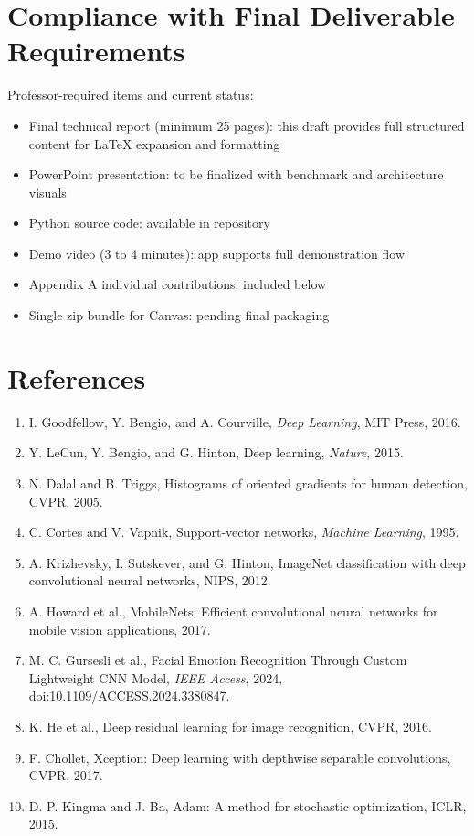 \documentclass[12pt,a4paper]{article}
\begin{document}
\section{Compliance with Final Deliverable Requirements}
Professor-required items and current status:
\begin{itemize}[leftmargin=*]
    \item Final technical report (minimum 25 pages): this draft provides full structured content for LaTeX expansion and formatting
    \item PowerPoint presentation: to be finalized with benchmark and architecture visuals
    \item Python source code: available in repository
    \item Demo video (3 to 4 minutes): app supports full demonstration flow
    \item Appendix A individual contributions: included below
    \item Single zip bundle for Canvas: pending final packaging
\end{itemize}

\section*{References}
\begin{enumerate}[leftmargin=*]
    \item I. Goodfellow, Y. Bengio, and A. Courville, \textit{Deep Learning}, MIT Press, 2016.
    \item Y. LeCun, Y. Bengio, and G. Hinton, Deep learning, \textit{Nature}, 2015.
    \item N. Dalal and B. Triggs, Histograms of oriented gradients for human detection, CVPR, 2005.
    \item C. Cortes and V. Vapnik, Support-vector networks, \textit{Machine Learning}, 1995.
    \item A. Krizhevsky, I. Sutskever, and G. Hinton, ImageNet classification with deep convolutional neural networks, NIPS, 2012.
    \item A. Howard et al., MobileNets: Efficient convolutional neural networks for mobile vision applications, 2017.
    \item M. C. Gursesli et al., Facial Emotion Recognition Through Custom Lightweight CNN Model, \textit{IEEE Access}, 2024, doi:10.1109/ACCESS.2024.3380847.
    \item K. He et al., Deep residual learning for image recognition, CVPR, 2016.
    \item F. Chollet, Xception: Deep learning with depthwise separable convolutions, CVPR, 2017.
    \item D. P. Kingma and J. Ba, Adam: A method for stochastic optimization, ICLR, 2015.
\end{enumerate}
\end{document}
